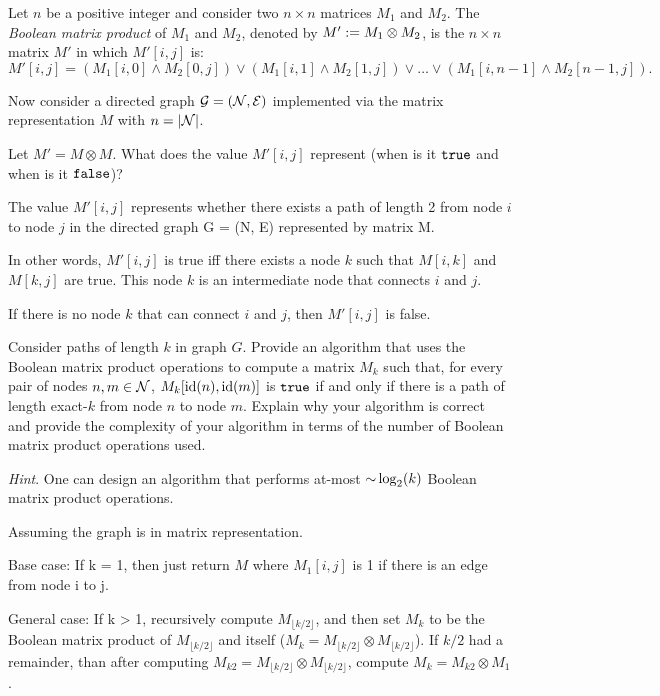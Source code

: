 \begin{problem}
Let $n$ be a positive integer and consider two $n \times n$ matrices $M_1$ and $M_2$. The \emph{Boolean matrix product} of $M_1$ and $M_2$, denoted by $M' := M_1 \otimes M_2$, is the $n \times n$ matrix $M'$ in which $M'[i, j]$ is:
\[ M'[i, j] = (M_1[i, 0] \land M_2[0, j]) \lor (M_1[i, 1] \land M_2[1, j]) \lor \dots \lor (M_1[i, n-1] \land M_2[n-1,j]). \]

Now consider a directed graph $\mathcal{G} = (\mathcal{N}, \mathcal{E})$ implemented via the matrix representation $M$ with $n = \lvert \mathcal{N} \rvert$.
\begin{questions}
\item Let $M' = M \otimes M$. What does the value $M'[i,j]$ represent (when is it $\texttt{true}$ and when is it $\texttt{false}$)?

The value $M'[i, j]$ represents whether there exists a path of length 2 from node $i$ to node $j$ in the directed graph G = (N, E) represented by matrix M.

In other words, $M'[i, j]$ is true iff there exists a node $k$ such that $M[i, k]$ and $M[k, j]$ are true. This node $k$ is an intermediate node that connects $i$ and $j$.

If there is no node $k$ that can connect $i$ and $j$, then $M'[i, j]$ is false.

\item Consider paths of length $k$ in graph $G$. Provide an algorithm that uses the Boolean matrix product operations to compute a matrix $M_k$ such that, for every pair of nodes $n, m \in \mathcal{N}$, $M_k[\operatorname{id}(n), \operatorname{id}(m)]$ is $\texttt{true}$ if and only if there is a path of length exact-$k$ from node $n$ to node $m$. Explain why your algorithm is correct and provide the complexity of your algorithm in terms of the number of Boolean matrix product operations used.

\textit{Hint}. One can design an algorithm that performs at-most $\mathord{\sim}\log_2(k)$ Boolean matrix product operations.

Assuming the graph is in matrix representation.

Base case: If k = 1, then just return $M$ where $M_1[i,j]$ is 1 if there is an edge from node i to j. 

General case: If k > 1, recursively compute $M_{\lfloor{k/2}\rfloor}$, and then set $M_k$ to be the Boolean matrix product of $M_{\lfloor{k/2}\rfloor}$ and itself ($M_k = M_{\lfloor{k/2}\rfloor} \otimes M_{\lfloor{k/2}\rfloor}$).
If $k/2$ had a remainder, than after computing $M_{k2} = M_{\lfloor{k/2}\rfloor} \otimes M_{\lfloor{k/2}\rfloor}$, compute $M_k = M_{k2} \otimes M_1$.


\end{questions}
\end{problem}
